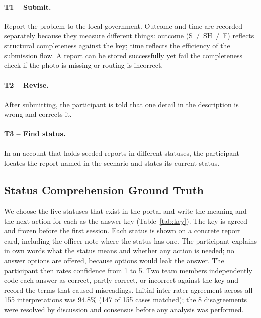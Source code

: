 \documentclass[11pt, runningheads, a4paper]{llncs}
\newcommand{\rev}[1]{#1}
\begin{document}
\paragraph{T1 -- Submit.} Report the problem to the local government.
Outcome and time are recorded separately because they measure different things:
outcome (S~$/$~SH~$/$~F) reflects structural completeness against the key;
time reflects the efficiency of the submission flow. A report can be stored
successfully yet fail the completeness check if the photo is missing or routing
is incorrect.
\paragraph{T2 -- Revise.} After submitting, the participant is told that one
detail in the description is wrong and corrects it.
\paragraph{T3 -- Find status.} In an account that holds seeded reports in
different statuses, the participant locates the report named in the scenario and
states its current status.

\subsection{Status Comprehension Ground Truth}
\label{sec:status}
We choose the five statuses that exist in the portal and write the meaning and
the next action for each as the answer key (Table~\ref{tab:key}). The key is
agreed and frozen before the first session. Each status is shown on a concrete
report card, including the officer note where the status has one. The participant
explains in own words what the status means and whether any action is needed;
no answer options are offered, because options would leak the answer. The
participant then rates confidence from 1 to 5. Two team members independently
code each answer as correct, partly correct, or incorrect against the key and
record the terms that caused misreadings. \rev{Initial inter-rater agreement across all 155 interpretations was 94.8\% (147 of 155 cases matched); the 8 disagreements were resolved by discussion and consensus before any analysis was performed.}
\end{document}
